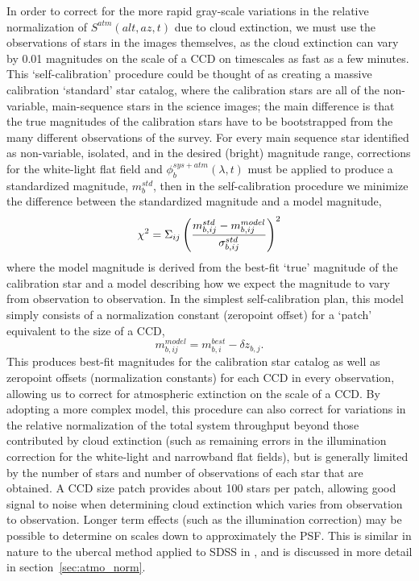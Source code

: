 \documentclass[12pt,preprint]{aastex}
\begin{document}
In order to correct for the more rapid gray-scale variations in the
relative normalization of $S^{atm}(alt,az,t)$ due to cloud extinction,
we must use the observations of stars in the images themselves, as the
cloud extinction can vary by 0.01 magnitudes on the scale of a CCD
\citep{Ivezic2007} on timescales as fast as a few minutes. This
`self-calibration' procedure could be thought of as creating a massive
calibration `standard' star catalog, where the calibration stars are
all of the non-variable, main-sequence stars in the science images;
the main difference is that the true magnitudes of the calibration
stars have to be bootstrapped from the many different observations of
the survey. For every main sequence star identified as non-variable,
isolated, and in the desired (bright) magnitude range, corrections for
the white-light flat field and $\phi_b^{sys+atm}(\lambda,t)$ must be
applied to produce a standardized magnitude, $m_b^{std}$, then in the
self-calibration procedure we minimize the difference between the
standardized magnitude and a model magnitude,
\begin{equation}
\label{eqn:chi2}
\chi^2 = \Sigma_{ij} \left( { m_{b,ij}^{std} - m_{b,ij}^{model} \over
\sigma_{b,ij}^{std} } \right)^2
\end{equation}
where the model magnitude is derived from the best-fit `true'
magnitude of the calibration star and a model describing how we expect
the magnitude to vary from observation to observation. In the simplest
self-calibration plan, this model simply consists of a normalization constant
(zeropoint offset) for a `patch' equivalent to the size of a CCD,
\begin{equation}
\label{eqn:modelmag}
m_{b,ij}^{model} = m_{b,i}^{best} - \delta z_{b,j}.
\end{equation}
This produces best-fit magnitudes for the calibration star catalog as
well as zeropoint offsets (normalization constants) for each CCD in
every observation, allowing us to correct for atmospheric extinction
on the scale of a CCD. By adopting a more complex model, this
procedure can also correct for variations in the relative
normalization of the total system throughput beyond those contributed
by cloud extinction (such as remaining errors in the illumination
correction for the white-light and narrowband flat fields), but is
generally limited by the number of stars and number of observations of
each star that are obtained. A CCD size patch provides about 100 stars
per patch, allowing good signal to noise when determining cloud
extinction which varies from observation to observation.  Longer
term effects (such as the illumination correction) may be possible to
determine on scales down to approximately the PSF.  This is similar in
nature to the ubercal method applied to SDSS in
\citet{Padmanabhan2008}, and is discussed in more detail in
section~\ref{sec:atmo_norm}.
\end{document}
